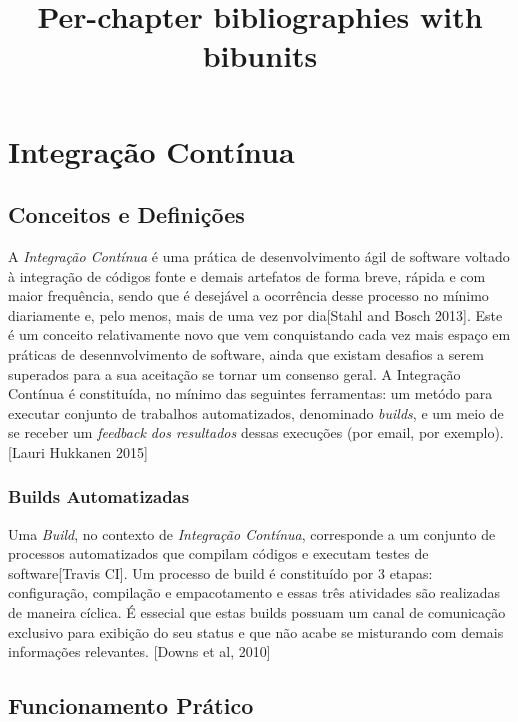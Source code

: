 \documentclass[11pt,oneside]{book}
\title{Per-chapter bibliographies with bibunits}
\begin{document}
\bibliographyunit[\chapter]


\frontmatter

\chapter{Integração Contínua}

\section{Conceitos e Definições}

A \emph{Integração Contínua} é uma prática de desenvolvimento ágil de software voltado à integração de códigos fonte e demais artefatos de forma breve, rápida e com maior frequência,  sendo que é desejável a ocorrência desse processo no mínimo diariamente e, pelo menos, mais de uma vez por dia[Stahl and Bosch 2013]. Este é um conceito relativamente novo que vem conquistando cada vez mais espaço em práticas de desennvolvimento de software, ainda que existam desafios a serem superados para a sua aceitação se tornar um consenso geral. A Integração Contínua é constituída, no mínimo das seguintes ferramentas: um metódo para executar conjunto de trabalhos automatizados, denominado \emph{builds}, e um meio de se receber um \emph{feedback dos resultados} dessas execuções (por email, por exemplo).[Lauri Hukkanen 2015]   

\subsection{Builds Automatizadas}

Uma \emph{Build}, no contexto de \emph{Integração Contínua}, corresponde a um conjunto de processos automatizados que compilam códigos e executam testes de software[Travis CI]. Um processo de build é constituído por 3 etapas: configuração, compilação e empacotamento e essas três atividades são realizadas de maneira cíclica. É essecial que estas builds possuam um canal de comunicação exclusivo para exibição do seu status e que não acabe se misturando com demais informações relevantes. [Downs et al, 2010]  

\section{Funcionamento Prático}
\end{document}
